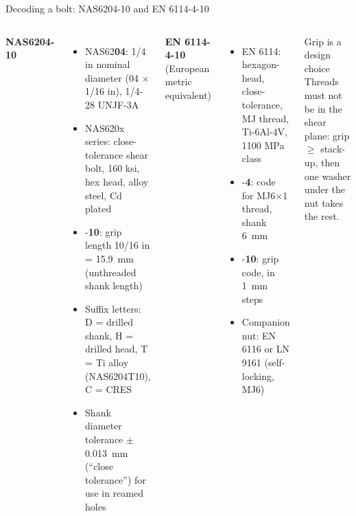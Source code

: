 \documentclass[aspectratio=169,10pt]{beamer}
\begin{document}
\begin{frame}{Decoding a bolt: NAS6204-10 and EN 6114-4-10}
\footnotesize
\begin{columns}[T]
\textbf{NAS6204-10}
\begin{itemize}
  \item NAS62\textbf{04}: 1/4 in nominal diameter (04 $\times$ 1/16 in), 1/4-28 UNJF-3A
  \item NAS620x series: close-tolerance shear bolt, 160 ksi, hex head, alloy steel, Cd plated
  \item -\textbf{10}: grip length 10/16 in = \SI{15.9}{mm} (unthreaded shank length)
  \item Suffix letters: D = drilled shank, H = drilled head, T = Ti alloy (NAS6204T10), C = CRES
  \item Shank diameter tolerance $\pm$\SI{0.013}{mm} (``close tolerance'') for use in reamed holes
\end{itemize}
\textbf{EN 6114-4-10} (European metric equivalent)
\begin{itemize}
  \item EN 6114: hexagon-head, close-tolerance, MJ thread, Ti-6Al-4V, 1100 MPa class
  \item -\textbf{4}: code for MJ6$\times$1 thread, shank \SI{6}{mm}
  \item -\textbf{10}: grip code, in \SI{1}{mm} steps
  \item Companion nut: EN 6116 or LN 9161 (self-locking, MJ6)
\end{itemize}
\begin{block}{Grip is a design choice}
Threads must not be in the shear plane: grip $\ge$ stack-up, then one washer under the nut takes the rest.
\end{block}
\end{columns}
\end{frame}
\end{document}
